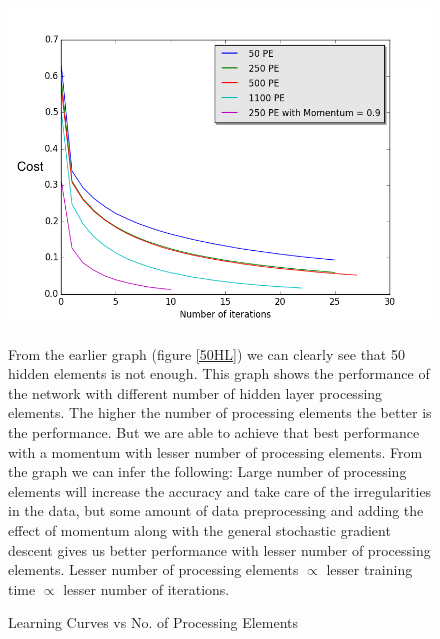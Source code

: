 \documentclass[conference]{IEEEtran}
\begin{document}
\begin{figure}
\includegraphics[scale=0.5]{PEvsAccuracy.png}
\caption{Learning Curves vs No. of Processing Elements}
\label{all PE}
\footnotesize{From the earlier graph (figure \ref{50HL})  we can clearly see that 50 hidden elements is not enough. This graph shows the performance of the network with different number of hidden layer processing elements. The higher the number of processing elements the better is the performance. But we are able to achieve that best performance with a momentum with lesser number of processing elements. From the graph we can infer the following: Large number of processing elements will increase the accuracy and take care of the irregularities in the data, but some amount of data preprocessing and adding the effect of momentum along with the general stochastic gradient descent gives us better performance with lesser number of processing elements. Lesser number of processing elements $\propto$ lesser training time $\propto$ lesser number of iterations.}
\end{figure}
\end{document}
